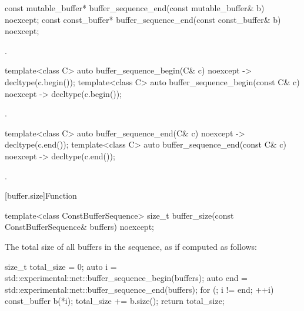 %
\begin{itemdecl}
const mutable_buffer* buffer_sequence_end(const mutable_buffer& b) noexcept;
const const_buffer* buffer_sequence_end(const const_buffer& b) noexcept;
\end{itemdecl}

\begin{itemdescr}
\pnum
\returns {}.
\end{itemdescr}

%
\begin{itemdecl}
template<class C> auto buffer_sequence_begin(C& c) noexcept -> decltype(c.begin());
template<class C> auto buffer_sequence_begin(const C& c) noexcept -> decltype(c.begin());
\end{itemdecl}

\begin{itemdescr}
\pnum
\returns {}.
\end{itemdescr}

%
\begin{itemdecl}
template<class C> auto buffer_sequence_end(C& c) noexcept -> decltype(c.end());
template<class C> auto buffer_sequence_end(const C& c) noexcept -> decltype(c.end());
\end{itemdecl}

\begin{itemdescr}
\pnum
\returns {}.
\end{itemdescr}



[buffer.size]{Function }

%
\begin{itemdecl}
template<class ConstBufferSequence>
  size_t buffer_size(const ConstBufferSequence& buffers) noexcept;
\end{itemdecl}

\begin{itemdescr}
\pnum
\returns The total size of all buffers in the sequence, as if computed as follows:
\begin{codeblock}
size_t total_size = 0;
auto i = std::experimental::net::buffer_sequence_begin(buffers);
auto end = std::experimental::net::buffer_sequence_end(buffers);
for (; i != end; ++i)
{
  const_buffer b(*i);
  total_size += b.size();
}
return total_size;
\end{codeblock}

\end{itemdescr}




